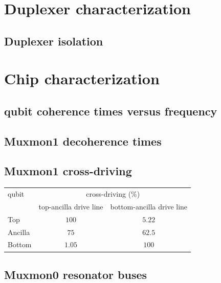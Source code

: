 

\chapter{Duplexer characterization}
  \section{Duplexer isolation}
  \label{ch:Duplexer isolation}

\chapter{Chip characterization}
  \section{qubit coherence times versus frequency}

  \section{Muxmon1 decoherence times}
    \label{sec:Muxmon1 decoherence times}



  \section{Muxmon1 cross-driving}
    \label{sec:Muxmon1 cross-driving}
      \begin{table}
        \begin{tabular}{l c c}
          \toprule
          qubit & \multicolumn{2}{c}{cross-driving (\%)} \\
          \cmidrule(lr){2-3}
               & top-ancilla drive line & bottom-ancilla drive line \\
          \midrule
          Top     & $100$    & $5.22$ \\
          Ancilla & $75$ & $62.5$ \\
          Bottom  & $1.05$ & $100$    \\
          \bottomrule
        \end{tabular}
        \label{tab:Muxmon1 cross-driving}
      \end{table}

  \section{Muxmon0 resonator buses}
    \label{sec:Resonator buses}

